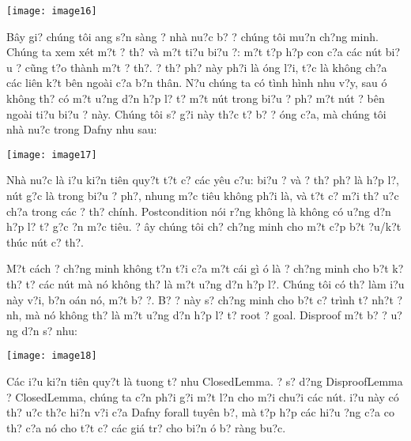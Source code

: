 \documentclass{article} %
\begin{document}
\noindent \texttt{[image: image16]}

B\^{a}y gi? ch\'{u}ng t\^{o}i {\dj}ang s?n s\`{a}ng {\dj}? nh\`{a} nu?c b? {\dj}? ch\'{u}ng t\^{o}i mu?n ch?ng minh. Ch\'{u}ng ta xem x\'{e}t m?t {\dj}? th? v\`{a} m?t ti?u bi?u {\dj}?: m?t t?p h?p con c?a c\'{a}c n\'{u}t bi?u {\dj}? c\~{u}ng t?o th\`{a}nh m?t {\dj}? th?. {\DJ}? th? ph? n\`{a}y ph?i l\`{a} {\dj}\'{o}ng l?i, t?c l\`{a} kh\^{o}ng ch?a c\'{a}c li\^{e}n k?t b\^{e}n ngo\`{a}i c?a b?n th\^{a}n. N?u ch\'{u}ng ta c\'{o} t\`{i}nh h\`{i}nh nhu v?y, sau {\dj}\'{o} kh\^{o}ng th? c\'{o} m?t {\dj}u?ng d?n h?p l? t? m?t n\'{u}t trong bi?u {\dj}? ph? m?t n\'{u}t ? b\^{e}n ngo\`{a}i ti?u bi?u {\dj}? n\`{a}y. Ch\'{u}ng t\^{o}i s? g?i n\`{a}y th?c t? b? {\dj}? {\dj}\'{o}ng c?a, m\`{a} ch\'{u}ng t\^{o}i nh\`{a} nu?c trong Dafny nhu sau:

\noindent \texttt{[image: image17]}

Nh\`{a} nu?c l\`{a} {\dj}i?u ki?n ti\^{e}n quy?t t?t c? c\'{a}c y\^{e}u c?u: bi?u {\dj}? v\`{a} {\dj}? th? ph? l\`{a} h?p l?, n\'{u}t g?c l\`{a} trong bi?u {\dj}? ph?, nhung m?c ti\^{e}u kh\^{o}ng ph?i l\`{a}, v\`{a} t?t c? m?i th? {\dj}u?c ch?a trong c\'{a}c {\dj}? th? ch\'{i}nh. Postcondition n\'{o}i r?ng kh\^{o}ng l\`{a} kh\^{o}ng c\'{o} {\dj}u?ng d?n h?p l? t? g?c {\dj}?n m?c ti\^{e}u. ? {\dj}\^{a}y ch\'{u}ng t\^{o}i ch? ch?ng minh cho m?t c?p b?t {\dj}?u/k?t th\'{u}c n\'{u}t c? th?.

M?t c\'{a}ch {\dj}? ch?ng minh kh\^{o}ng t?n t?i c?a m?t c\'{a}i g\`{i} {\dj}\'{o} l\`{a} {\dj}? ch?ng minh cho b?t k? th? t? c\'{a}c n\'{u}t m\`{a} n\'{o} kh\^{o}ng th? l\`{a} m?t {\dj}u?ng d?n h?p l?. Ch\'{u}ng t\^{o}i c\'{o} th? l\`{a}m {\dj}i?u n\`{a}y v?i, b?n {\dj}o\'{a}n n\'{o}, m?t b? {\dj}?. B? {\dj}? n\`{a}y s? ch?ng minh cho b?t c? tr\`{i}nh t? nh?t {\dj}?nh, m\`{a} n\'{o} kh\^{o}ng th? l\`{a} m?t {\dj}u?ng d?n h?p l? t? root {\dj}? goal. Disproof m?t b? {\dj}? {\dj}u?ng d?n s? nhu:

\noindent \texttt{[image: image18]}

C\'{a}c {\dj}i?u ki?n ti\^{e}n quy?t l\`{a} tuong t? nhu ClosedLemma. {\DJ}? s? d?ng DisproofLemma ? ClosedLemma, ch\'{u}ng ta c?n ph?i g?i m?t l?n cho m?i chu?i c\'{a}c n\'{u}t. {\DJ}i?u n\`{a}y c\'{o} th? {\dj}u?c th?c hi?n v?i c?a Dafny forall tuy\^{e}n b?, m\`{a} t?p h?p c\'{a}c hi?u ?ng c?a co th? c?a n\'{o} cho t?t c? c\'{a}c gi\'{a} tr? cho bi?n {\dj}\'{o} b? r\`{a}ng bu?c.
\end{document}
